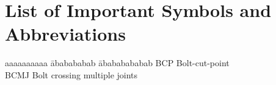\chapter*{\huge{List of Important Symbols and Abbreviations}}

\begin{tabbing}
	aaaaaaaaaa \= ababababab \= abababababab \kill
	BCP\>\>	Bolt-cut-point\\	
	BCMJ\>\>	Bolt crossing multiple joints\\				
\end{tabbing}


